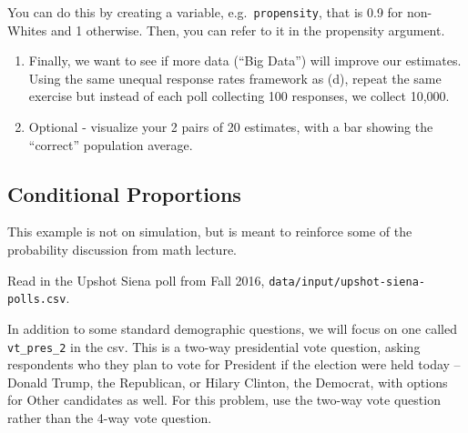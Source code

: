 \documentclass[
]{book}
\theoremstyle{definition}
\theoremstyle{definition}
\theoremstyle{definition}
\theoremstyle{definition}
\theoremstyle{remark}
\begin{document}
You can do this by creating a variable, e.g.~\texttt{propensity}, that is 0.9 for non-Whites and 1 otherwise. Then, you can refer to it in the propensity argument.

\begin{enumerate}
\def\labelenumi{(\alph{enumi})}
\setcounter{enumi}{4}
\item
  Finally, we want to see if more data (``Big Data'') will improve our estimates. Using the same unequal response rates framework as (d), repeat the same exercise but instead of each poll collecting 100 responses, we collect 10,000.
\item
  Optional - visualize your 2 pairs of 20 estimates, with a bar showing the ``correct'' population average.
\end{enumerate}

\hypertarget{conditional-proportions}{%
\subsection*{Conditional Proportions}\label{conditional-proportions}}

This example is not on simulation, but is meant to reinforce some of the probability discussion from math lecture.

Read in the Upshot Siena poll from Fall 2016, \texttt{data/input/upshot-siena-polls.csv}.

In addition to some standard demographic questions, we will focus on one called \texttt{vt\_pres\_2} in the csv. This is a two-way presidential vote question, asking respondents who they plan to vote for President if the election were held today -- Donald Trump, the Republican, or Hilary Clinton, the Democrat, with options for Other candidates as well. For this problem, use the two-way vote question rather than the 4-way vote question.
\end{document}
